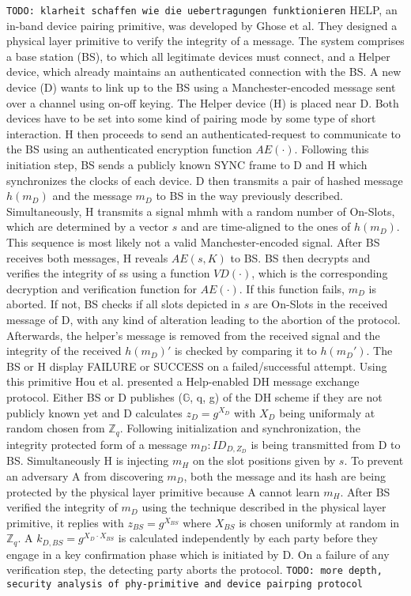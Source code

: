 \documentclass[conference]{IEEEtran}
\begin{document}
\texttt{TODO: klarheit schaffen wie die uebertragungen funktionieren}
HELP, an in-band device pairing primitive, was developed by Ghose et al. They designed a physical layer primitive to verify the integrity of a message. The system comprises a base station (BS), to which all legitimate devices must connect, and a Helper device, which already maintains an authenticated connection with the BS. A new device (D) wants to link up to the BS using a Manchester-encoded message sent over a channel using on-off keying.
The Helper device (H) is placed near D. Both devices have to be set into some kind of pairing mode by some type of short interaction. H then proceeds to send an authenticated-request to communicate to the BS using an authenticated encryption function $AE(\cdot)$. Following this initiation step, BS sends a publicly known SYNC frame to D and H which synchronizes the clocks of each device.
D then transmits a pair of hashed message $h(m_D)$ and the message $m_D$ to BS in the way previously described. Simultaneously, H transmits a signal mhmh with a random number of On-Slots, which are determined by a vector $s$ and are time-aligned to the ones of $h(m_D)$. This sequence is most likely not a valid Manchester-encoded signal.
After BS receives both messages, H reveals $AE(s,K)$ to BS. BS then decrypts and verifies the integrity of ss using a function $VD(\cdot)$, which is the corresponding decryption and verification function for $AE(\cdot)$. If this function fails, $m_D$ is aborted. If not, BS checks if all slots depicted in $s$ are On-Slots in the received message of D, with any kind of alteration leading to the abortion of the protocol.
Afterwards, the helper's message is removed from the received signal and the integrity of the received $h(m_D)'$ is checked by comparing it to $h(m_D')$. The BS or H display FAILURE or SUCCESS on a failed/successful attempt.
Using this primitive Hou et al. presented a Help-enabled DH message exchange protocol. Either BS or D publishes ($\mathbb{G}$, q, g) of the DH scheme if they are not publicly known yet and D calculates $z_D = g^{X_D}$ with $X_D$ being uniformaly at random chosen from $\mathbb{Z}_q$. Following initialization and synchronization, the integrity protected form of a message $m_D: ID_{D,Z_D}$ is being transmitted from D to BS. Simultaneously H is injecting $m_H$ on the slot positions given by $s$. To prevent an adversary A from discovering $m_D$, both the message and its hash are being protected by the physical layer primitive because A cannot learn $m_H$. After BS verified the integrity of $m_D$ using the technique described in the physical layer primitive, it replies with $z_{BS} = g^{X_{BS}}$ where $X_{BS}$ is chosen uniformly at random in $\mathbb{Z}_q$. A $k_{D,BS}=g^{X_D \cdot X_{BS}}$ is calculated independently by each party before they engage in a key confirmation phase which is initiated by D. On a failure of any verification step, the detecting party aborts the protocol. 
 \texttt{TODO: more depth, security analysis of phy-primitive and device pairping protocol}\\
\end{document}
